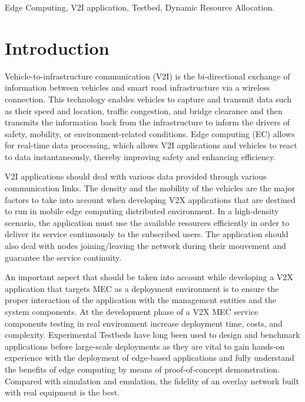\documentclass[conference]{IEEEtran}
\begin{document}
\begin{IEEEkeywords}
Edge Computing, V2I application, Testbed, Dynamic Resource Allocation. 
\end{IEEEkeywords}

\section{Introduction}
\par Vehicle-to-infrastructure communication (V2I) is the bi-directional exchange of information between vehicles and smart road infrastructure via a wireless connection.
This technology enables vehicles to capture and transmit data such as their speed and location, traffic congestion, and bridge clearance and then transmits the information back from the infrastructure to inform the drivers of safety, mobility, or environment-related conditions. Edge computing (EC) allows for real-time data processing, which allows V2I applications and vehicles to react to data instantaneously, thereby improving safety and enhancing efficiency.
\par V2I applications should deal with various data provided through various communication links. The density and the
mobility of the vehicles are the major factors to take into account when developing V2X applications that are destined to run in mobile edge computing distributed environment. In a high-density scenario, the application must use the available resources efficiently in order to deliver its service continuously to the subscribed users. The application should also deal with nodes joining/leaving the network during their mouvement and guarantee the service continuity. 
\par An important aspect that should be taken into account while developing a V2X application that targets MEC as a deployment environment is to ensure the proper interaction of the application with the management entities and the system components. At the development phase of a V2X MEC service components testing in real environment increase deployment time, costs, and complexity. 
Experimental Testbeds have long been used to design and benchmark applications before large-scale deployments\cite{berman2014geni,ertin2006kansei,keahey2020lessons} as they are vital to gain hands-on experience with the deployment of edge-based applications and fully understand the benefits of edge computing by means of proof-of-concept demonstration. Compared with simulation and emulation, the fidelity of an overlay network built with real
equipment is the best.  
\end{document}
